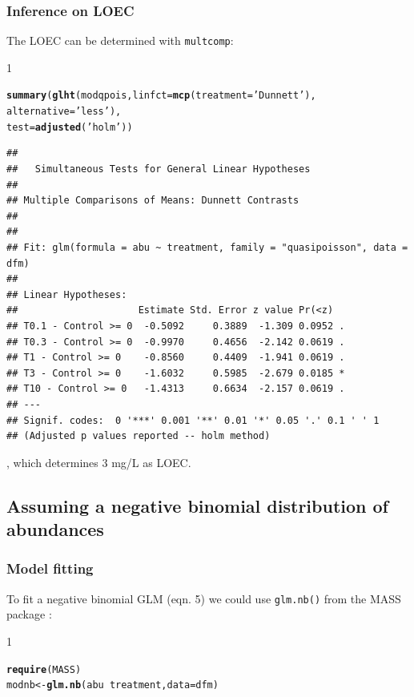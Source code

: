 \documentclass{scrartcl}\usepackage[]{graphicx}\usepackage[]{color}
\makeatletter
\newcommand{\hlstr}[1]{\textcolor[rgb]{0.192,0.494,0.8}{#1}}%
\newcommand{\hlopt}[1]{\textcolor[rgb]{0,0,0}{#1}}%
\newcommand{\hlstd}[1]{\textcolor[rgb]{0.345,0.345,0.345}{#1}}%
\newcommand{\hlkwb}[1]{\textcolor[rgb]{0.69,0.353,0.396}{#1}}%
\newcommand{\hlkwc}[1]{\textcolor[rgb]{0.333,0.667,0.333}{#1}}%
\newcommand{\hlkwd}[1]{\textcolor[rgb]{0.737,0.353,0.396}{\textbf{#1}}}%
\newenvironment{kframe}{%
 \def\at@end@of@kframe{}%
 \ifinner\ifhmode%
  \def\at@end@of@kframe{\end{minipage}}%
  \begin{minipage}{\columnwidth}%
 \fi\fi%
 \def\FrameCommand##1{\hskip\@totalleftmargin \hskip-\fboxsep
 \colorbox{shadecolor}{##1}\hskip-\fboxsep
     \hskip-\linewidth \hskip-\@totalleftmargin \hskip\columnwidth}%
 \MakeFramed {\advance\hsize-\width
   \@totalleftmargin\z@ \linewidth\hsize
   \@setminipage}}%
 {\par\unskip\endMakeFramed%
 \at@end@of@kframe}
\newenvironment{knitrout}{}{} %
\renewenvironment{knitrout}{\begin{spacing}{1}}{\end{spacing}}
\makeatother
\begin{document}
\subsubsection{Inference on LOEC}
The LOEC can be determined with \texttt{multcomp}:
\begin{knitrout}
\color{fgcolor}\begin{kframe}
\begin{alltt}
\hlkwd{summary}\hlstd{(}\hlkwd{glht}\hlstd{(modqpois,} \hlkwc{linfct} \hlstd{=} \hlkwd{mcp}\hlstd{(}\hlkwc{treatment} \hlstd{=} \hlstr{'Dunnett'}\hlstd{),}
             \hlkwc{alternative} \hlstd{=} \hlstr{'less'}\hlstd{),}
        \hlkwc{test} \hlstd{=} \hlkwd{adjusted}\hlstd{(}\hlstr{'holm'}\hlstd{))}
\end{alltt}
\begin{verbatim}
## 
## 	 Simultaneous Tests for General Linear Hypotheses
## 
## Multiple Comparisons of Means: Dunnett Contrasts
## 
## 
## Fit: glm(formula = abu ~ treatment, family = "quasipoisson", data = dfm)
## 
## Linear Hypotheses:
##                     Estimate Std. Error z value Pr(<z)  
## T0.1 - Control >= 0  -0.5092     0.3889  -1.309 0.0952 .
## T0.3 - Control >= 0  -0.9970     0.4656  -2.142 0.0619 .
## T1 - Control >= 0    -0.8560     0.4409  -1.941 0.0619 .
## T3 - Control >= 0    -1.6032     0.5985  -2.679 0.0185 *
## T10 - Control >= 0   -1.4313     0.6634  -2.157 0.0619 .
## ---
## Signif. codes:  0 '***' 0.001 '**' 0.01 '*' 0.05 '.' 0.1 ' ' 1
## (Adjusted p values reported -- holm method)
\end{verbatim}
\end{kframe}
\end{knitrout}
, which determines 3 mg/L as LOEC.


\subsection{Assuming a negative binomial distribution of abundances}
\subsubsection{Model fitting}
To fit a negative binomial GLM (eqn. 5) we could use \texttt{glm.nb()} from the MASS package \citep{venables_modern_2002}:
\begin{knitrout}
\color{fgcolor}\begin{kframe}
\begin{alltt}
\hlkwd{require}\hlstd{(MASS)}
\hlstd{modnb} \hlkwb{<-} \hlkwd{glm.nb}\hlstd{(abu} \hlopt{~} \hlstd{treatment,} \hlkwc{data} \hlstd{= dfm)}
\end{alltt}
\end{kframe}
\end{knitrout}
\end{document}
